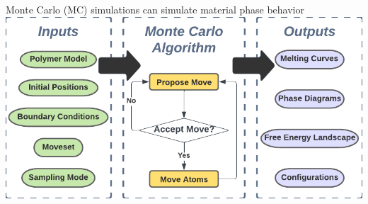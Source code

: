 \documentclass[aspectratio=169]{beamer}
\begin{document}
\begin{frame}{Monte Carlo (MC) simulations can simulate material phase behavior}
  \centering
  \includegraphics[]{figs/fig-MC_alg_inputs_outputs.pdf}
\end{frame}
\end{document}
